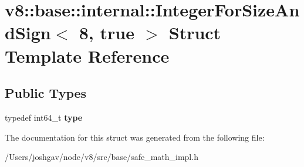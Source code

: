 \hypertarget{structv8_1_1base_1_1internal_1_1_integer_for_size_and_sign_3_018_00_01true_01_4}{}\section{v8\+:\+:base\+:\+:internal\+:\+:Integer\+For\+Size\+And\+Sign$<$ 8, true $>$ Struct Template Reference}
\label{structv8_1_1base_1_1internal_1_1_integer_for_size_and_sign_3_018_00_01true_01_4}
\subsection*{Public Types}
\begin{DoxyCompactItemize}
\item 
typedef int64\+\_\+t {\bfseries type}\hypertarget{structv8_1_1base_1_1internal_1_1_integer_for_size_and_sign_3_018_00_01true_01_4_a36eba77a5bfacf6f64652b9687fa0c5e}{}\label{structv8_1_1base_1_1internal_1_1_integer_for_size_and_sign_3_018_00_01true_01_4_a36eba77a5bfacf6f64652b9687fa0c5e}

\end{DoxyCompactItemize}


The documentation for this struct was generated from the following file\+:\begin{DoxyCompactItemize}
\item 
/\+Users/joshgav/node/v8/src/base/safe\+\_\+math\+\_\+impl.\+h\end{DoxyCompactItemize}
